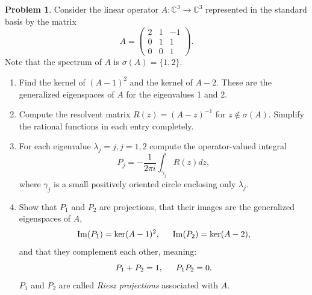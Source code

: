 \documentclass[12pt]{article}
\theoremstyle{definition}
\newtheorem{ex}{Problem}
\begin{document}
\begin{ex}
  Consider the linear operator $A : \mathbb{C}^3 \to \mathbb{C}^3$ represented in the standard basis by the matrix \begin{equation*}
    A = \begin{pmatrix}2 & 1 & -1 \\ 0 & 1 & 1 \\ 0 & 0 & 1\end{pmatrix}.
  \end{equation*}
  Note that the spectrum of $A$ is $\sigma(A) = \lbrace 1, 2 \rbrace$.
  \begin{enumerate}[label=(\alph*)]
    \item Find the kernel of $(A-1)^2$ and the kernel of $A-2$.
      These are the generalized eigenspaces of $A$ for the eigenvalues 1 and 2.
    \item Compute the resolvent matrix $R(z) = (A-z)^{-1}$ for $z \not\in \sigma(A)$.
      Simplify the rational functions in each entry completely.
    \item For each eigenvalue $\lambda_j = j, j = 1,2$ compute the operator-valued integral \begin{equation*}
        P_j = -\frac{1}{2\pi i} \int_{\gamma_j} R(z) dz,
    \end{equation*}
    where $\gamma_j$ is a small positively oriented circle enclosing only $\lambda_j$.
  \item Show that $P_1$ and $P_2$ are projections, that their images are the generalized eigenspaces of $A$, \begin{equation*}
      \mathrm{Im}(P_1) = \ker(A-1)^2, \hspace{1.5em} \mathrm{Im}(P_2) = \ker(A-2),
  \end{equation*}
  and that they complement each other, meaning: \begin{equation*}
    P_1 + P_2 = 1, \hspace{1.5em} P_1P_2 = 0.
  \end{equation*}
  $P_1$ and $P_2$ are called \textit{Riesz projections} associated with $A$.
  \end{enumerate}
\end{ex}
\end{document}
